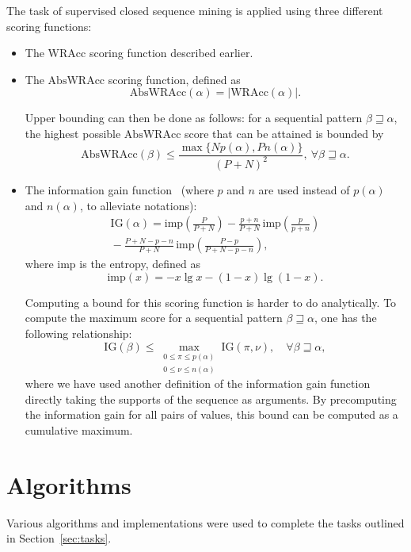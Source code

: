 \documentclass{sigkddExp}
\newcommand{\abs}[1]{|#1|}
\newcommand{\wracc}{\mathrm{WRAcc}}
\newcommand{\abswracc}{\mathrm{AbsWRAcc}}
\newcommand{\ig}{\mathrm{IG}}
\newcommand{\imp}{\mathrm{imp}}
\begin{document}
The task of supervised closed sequence mining is applied using three different scoring functions:
\begin{itemize}
	\item The \(\wracc\) scoring function described earlier.
	\item The \(\abswracc\) scoring function, defined as
	\begin{equation}
	\abswracc(\alpha) = \abs{\wracc(\alpha)}.
	\end{equation}
	
	Upper bounding can then be done as follows: for a sequential pattern \(\beta \sqsupseteq \alpha\), the highest possible \(\abswracc\) score that can be attained is bounded by
	\begin{equation}
	\abswracc(\beta) \leqslant \frac{\max\{N p(\alpha), P n(\alpha)\}}{(P + N)^2}, \ \forall \beta \sqsupseteq \alpha.
	\end{equation}
	\item The information gain function~\cite{Quinlan1986} (where \(p\) and \(n\) are used instead of \(p(\alpha)\) and \(n(\alpha)\), to alleviate notations):
	\begin{multline}
	\ig(\alpha) = \imp\left(\frac{P}{P + N}\right) - \frac{p + n}{P + N}\, \imp\left(\frac{p}{p + n}\right) \\
	{} - \frac{P + N - p - n}{P + N}\, \imp\left(\frac{P - p}{P + N - p - n}\right),
	\end{multline}
	where \(\imp\) is the entropy, defined as
	\begin{equation}
	\imp(x) = - x \lg x - (1-x) \lg (1-x).
	\end{equation}
	
	Computing a bound for this scoring function is harder to do analytically.
	To compute the maximum score for a sequential pattern \(\beta \sqsupseteq \alpha\), one has the following relationship:
	\begin{equation}
	\ig(\beta) \leqslant \max_{\substack{0 \leqslant \pi \leqslant p(\alpha) \\ 0 \leqslant \nu \leqslant n(\alpha)}} \ig(\pi, \nu), \quad \forall \beta \sqsupseteq \alpha,
	\end{equation}
	where we have used another definition of the information gain function directly taking the supports of the sequence as arguments.
	By precomputing the information gain for all pairs of values, this bound can be computed as a cumulative maximum.
\end{itemize}

\section{Algorithms}
Various algorithms and implementations were used to complete the tasks outlined in Section~\ref{sec:tasks}.
\end{document}
